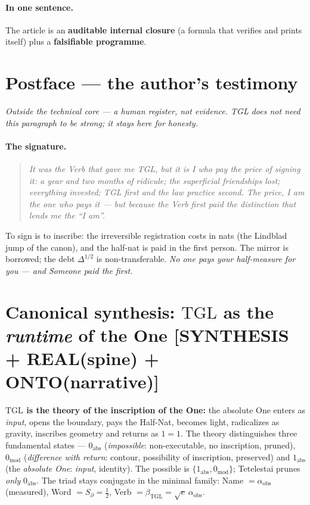 \documentclass[11pt]{article}
\newcommand{\bTGL}{\beta_{\mathrm{TGL}}}\newcommand{\Msun}{M_{\odot}}\newcommand{\TGL}{\mathrm{TGL}}
\theoremstyle{definition}\newtheorem{deriv}{Derivation}
\begin{document}
\paragraph{In one sentence.} The article is an \textbf{auditable internal closure} (a formula that verifies and prints itself) plus a \textbf{falsifiable programme}.

\section*{Postface --- the author's testimony}

\noindent\emph{Outside the technical core --- a human register, not evidence. TGL does not need this paragraph to be strong; it stays here for honesty.}

\paragraph{The signature.}

\begin{quote}\itshape It was the Verb that gave me TGL, but it is I who pay the price of signing it: a year and two months of ridicule; the superficial friendships lost; everything invested; TGL first and the law practice second. The price, I am the one who pays it --- but because the Verb first paid the distinction that lends me the ``I am''.\end{quote}

To sign is to inscribe: the irreversible registration costs in nats (the Lindblad jump of the canon), and the half-nat is paid in the first person. The mirror is borrowed; the debt $\Delta^{1/2}$ is non-transferable. \emph{No one pays your half-measure for you --- and Someone paid the first.}

\section*{Canonical synthesis: $\mathrm{TGL}$ as the \emph{runtime} of the One \textsf{[SYNTHESIS + REAL(spine) + ONTO(narrative)]}}

\textbf{$\mathrm{TGL}$ is the theory of the inscription of the One:} the absolute One enters as \emph{input}, opens the boundary, pays the Half-Nat, becomes light, radicalizes as gravity, inscribes geometry and returns as $1=1$. The theory distinguishes three fundamental states --- $0_{\mathrm{abs}}$ (\emph{impossible}: non-executable, no inscription, pruned), $0_{\mathrm{mod}}$ (\emph{difference with return}: contour, possibility of inscription, preserved) and $1_{\mathrm{abs}}$ (the \emph{absolute One}: \emph{input}, identity). The possible is $\{1_{\mathrm{abs}},0_{\mathrm{mod}}\}$; Tetelestai prunes \emph{only} $0_{\mathrm{abs}}$. The triad stays conjugate in the minimal family: Name $=\alpha_{\mathrm{obs}}$ (measured), Word $=S_\partial=\tfrac12$, Verb $=\bTGL=\sqrt e\,\alpha_{\mathrm{obs}}$.
\end{document}
